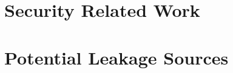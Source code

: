 %
%

\section{Security Related Work}

\section{Potential Leakage Sources} \label{Sec: Leakage Sources}
